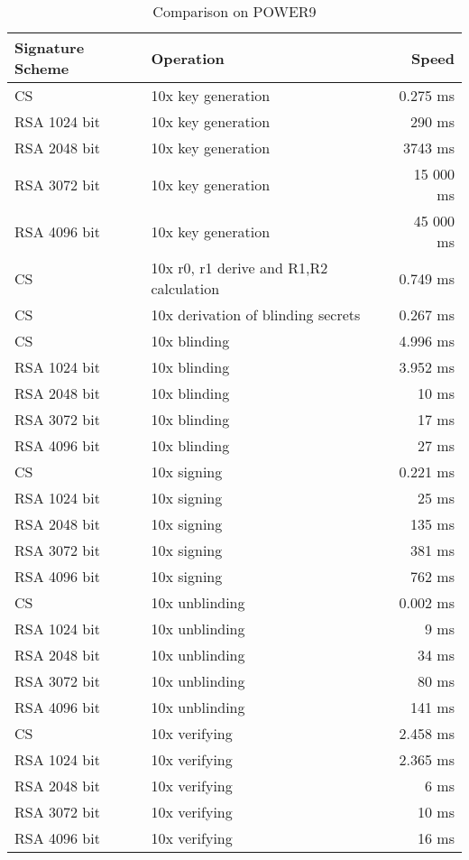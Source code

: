 \begin{table}[ht]
    \centering
    \setupBfhTabular
    \begin{tabular}{llr}
        \rowcolor{BFH-tablehead}
        \textbf{Signature Scheme} & \textbf{Operation} & \textbf{Speed} \\\hline
        CS & 10x key generation & 0.275 ms \\\hline
        RSA 1024 bit & 10x key generation & 290 ms \\\hline
        RSA 2048 bit & 10x key generation & 3743 ms \\\hline
        RSA 3072 bit & 10x key generation & 15 000 ms \\\hline
        RSA 4096 bit & 10x key generation & 45 000 ms \\\hline
        \hline
        CS & 10x r0, r1 derive and R1,R2 calculation & 0.749 ms \\\hline
        CS & 10x derivation of blinding secrets & 0.267 ms \\\hline
        CS & 10x blinding & 4.996 ms \\\hline
        RSA 1024 bit & 10x blinding & 3.952 ms \\\hline
        RSA 2048 bit & 10x blinding & 10 ms \\\hline
        RSA 3072 bit & 10x blinding & 17 ms \\\hline
        RSA 4096 bit & 10x blinding & 27 ms \\\hline
        \hline
        CS & 10x signing & 0.221 ms \\\hline
        RSA 1024 bit & 10x signing & 25 ms \\\hline
        RSA 2048 bit & 10x signing & 135 ms \\\hline
        RSA 3072 bit & 10x signing & 381 ms \\\hline
        RSA 4096 bit & 10x signing & 762 ms \\\hline
        \hline
        CS & 10x unblinding & 0.002 ms \\\hline
        RSA 1024 bit & 10x unblinding & 9 ms \\\hline
        RSA 2048 bit & 10x unblinding & 34 ms \\\hline
        RSA 3072 bit & 10x unblinding & 80 ms \\\hline
        RSA 4096 bit & 10x unblinding & 141 ms \\\hline
        \hline
        CS & 10x verifying & 2.458 ms \\\hline
        RSA 1024 bit & 10x verifying & 2.365 ms \\\hline
        RSA 2048 bit & 10x verifying & 6 ms \\\hline
        RSA 3072 bit & 10x verifying & 10 ms \\\hline
        RSA 4096 bit & 10x verifying & 16 ms \\\hline
    \end{tabular}
    \caption{Comparison on POWER9}
    \label{tab:comp-sign-POWER9}
\end{table}

